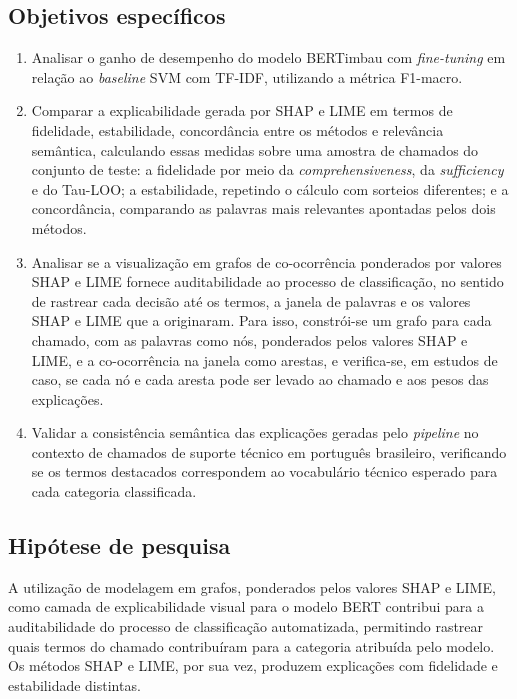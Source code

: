 \documentclass[
    12pt,                %
    openright,           %
    oneside,             %
    a4paper,             %
    english,             %
    brazil               %
]{abntex2}
\begin{document}
\subsection{Objetivos específicos}
\begin{enumerate}
    \item Analisar o ganho de desempenho do modelo BERTimbau com 
    \textit{fine-tuning} em relação ao \textit{baseline} SVM com 
    TF-IDF, utilizando a métrica F1-macro.

    \item Comparar a explicabilidade gerada por SHAP e LIME em
    termos de fidelidade, estabilidade, concordância entre os
    métodos e relevância semântica, calculando essas medidas
    sobre uma amostra de chamados do conjunto de teste:
    a fidelidade por meio da \textit{comprehensiveness}, da
    \textit{sufficiency} e do Tau-LOO; a estabilidade, repetindo
    o cálculo com sorteios diferentes; e a concordância,
    comparando as palavras mais relevantes apontadas pelos dois métodos.
    
    \item Analisar se a visualização em grafos de co-ocorrência
    ponderados por valores SHAP e LIME fornece auditabilidade
    ao processo de classificação, no sentido de
    rastrear cada decisão até os termos, a janela de palavras e
    os valores SHAP e LIME que a originaram. Para isso, constrói-se
    um grafo para cada chamado, com as palavras como nós, ponderados
    pelos valores SHAP e LIME, e a co-ocorrência na janela como arestas,
    e verifica-se, em estudos de caso, se cada nó e cada aresta
    pode ser levado ao chamado e aos pesos das explicações.

    \item Validar a consistência semântica das explicações 
    geradas pelo \textit{pipeline} no contexto de chamados de 
    suporte técnico em português brasileiro, verificando se os 
    termos destacados correspondem ao vocabulário técnico 
    esperado para cada categoria classificada.
\end{enumerate}

\subsection{Hipótese de pesquisa}
\label{sec:hipotese_pesquisa}

A utilização de modelagem em grafos, ponderados pelos valores SHAP e LIME, 
como camada de explicabilidade visual para o modelo BERT contribui para a 
auditabilidade do processo de classificação automatizada, permitindo rastrear 
quais termos do chamado contribuíram para a categoria atribuída pelo modelo. 
Os métodos SHAP e LIME, por sua vez, produzem explicações com fidelidade e estabilidade distintas.
\end{document}
